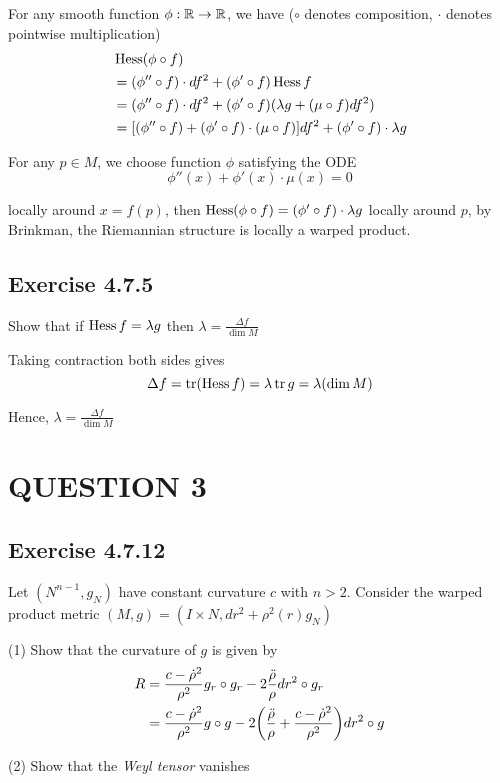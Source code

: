 For any smooth function $\phi: \mathbb{R} \to \mathbb{R}$, we have ($\circ$ denotes composition, $\cdot$ denotes pointwise multiplication)
\begin{align*}
	&\operatorname{Hess} (\phi \circ f) \\
	&= (\phi'' \circ f) \cdot df^2 + (\phi' \circ f) \operatorname{Hess} f \\
	&= (\phi'' \circ f) \cdot df^2 + (\phi' \circ f) (\lambda g + (\mu \circ f) df^2) \\
	&= [(\phi'' \circ f) + (\phi' \circ f) \cdot (\mu \circ f)] df^2 + (\phi' \circ f) \cdot \lambda g
\end{align*}

For any $p \in M$, we choose function $\phi$ satisfying the ODE
$$
	\phi''(x) + \phi'(x) \cdot \mu(x) = 0
$$

locally around $x = f(p)$, then $\operatorname{Hess} (\phi \circ f) = (\phi' \circ f) \cdot \lambda g$ locally around $p$, by Brinkman, the Riemannian structure is locally a warped product.


\subsection{Exercise 4.7.5}

\begin{problem}[Exercise 4.7.5]
	Show that if $\operatorname{Hess} f = \lambda g$ then $\lambda = \frac{\Delta f}{\dim M}$
\end{problem}

Taking contraction both sides gives
$$
	\Delta f = \operatorname{tr} (\operatorname{Hess} f) = \lambda \operatorname{tr} g = \lambda (\dim M)
$$

Hence, $\lambda = \frac{\Delta f}{\dim M}$

\section{QUESTION 3}

\subsection{Exercise 4.7.12}

\begin{problem}[Exercise 4.7.12]
	Let $(N^{n-1}, g_N)$ have constant curvature $c$ with $n > 2$. Consider the warped product metric $(M, g) = (I \times N, dr^2 + \rho^2(r) g_N)$ 

	(1) Show that the curvature of $g$ is given by
	\begin{align*}
		R
		&= \frac{c - \dot{\rho}^2}{\rho^2} g_r \circ g_r - 2 \frac{\ddot{\rho}}{\rho} dr^2 \circ g_r \\
		&=  \frac{c - \dot{\rho}^2}{\rho^2} g \circ g - 2 \tuple*{\frac{\ddot{\rho}}{\rho} + \frac{c - \dot{\rho}^2}{\rho^2}} dr^2 \circ g
	\end{align*}
	
	(2) Show that the \textit{Weyl tensor} vanishes
\end{problem}

